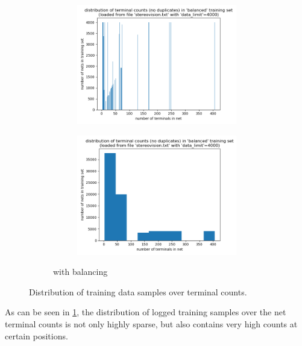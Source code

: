 \begin{figure}
\begin{subfigure}[b]{0.49\linewidth}
\begin{subfigure}[b]{\linewidth}
			\includegraphics[width=\linewidth]{plots/data-distribution-limited-fine.png}
		\end{subfigure}
		\begin{subfigure}[b]{\linewidth}
			\includegraphics[width=\linewidth]{plots/data-distribution-limited-coarse.png}
		\end{subfigure}
		\caption{with balancing}
	\end{subfigure}
	\caption{Distribution of training data samples over terminal counts.}
	\label{fig:data-hist}
\end{figure}

As can be seen in \ref{fig:data-hist}, the distribution of logged training samples over the net terminal counts is not only highly sparse, but also contains very high counts at certain positions.

